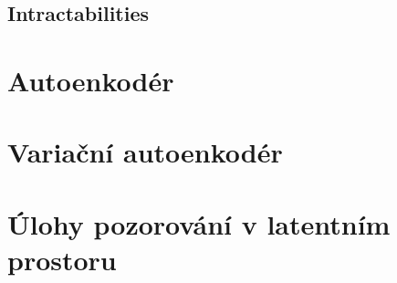 \documentclass[11pt,a4paper]{report}
\begin{document}
\section{Intractabilities} 

\chapter{Autoenkodér}
\label{chap:autoencoder}
















\chapter{Variační autoenkodér}
\label{chap:vae}
















\chapter{Úlohy pozorování v latentním prostoru}
\label{chap:applications}

\end{document}
